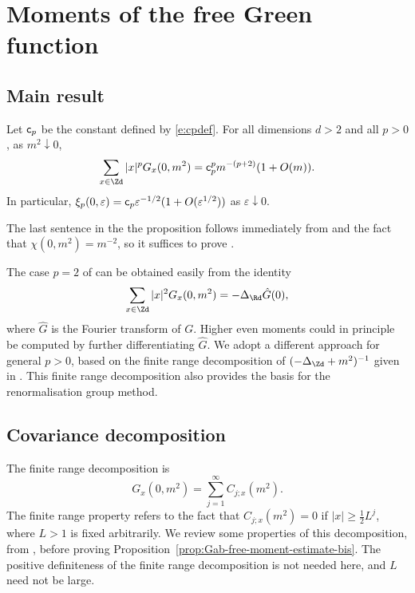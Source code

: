 \chapter{Moments of the free Green function}
\label{app:free-moments}

\section{Main result}

\begin{prop}\label{prop:Gab-free-moment-estimate-bis}
Let ${\sf c}_p$ be the constant defined by \eqref{e:cpdef}.
For all dimensions $d>2$ and all $p>0$,
as $m^2 \downarrow 0$,
\begin{equation}
\label{e:Gab-free-moment-estimate-bis}
\sum_{x\in\Zd} |x|^p G_{x}(0, m^2)
=
{\sf c}_p^p m^{-(p + 2)} (1 + O(m)).
\end{equation}
In particular, $\xi_p(0,\varepsilon) = {\sf c}_p \varepsilon^{-1/2}
(1+O(\varepsilon^{1/2}))$ as $\varepsilon \downarrow 0$.
\end{prop}

The last sentence in the the proposition follows immediately from
 and the fact that $\chi(0,m^2)=m^{-2}$,
so it suffices to prove .

The case $p = 2$ of 
can be obtained easily from the identity
\begin{equation}
\sum_{x\in\Zd} |x|^2 G_x(0, m^2) = -\Delta_\Rd \hat{G}(0),
\end{equation}
where $\hat G$ is the Fourier transform of $G$.
Higher even moments could in principle
be computed by further differentiating $\hat G$.
We adopt a different approach
for general $p>0$,
based on the finite range decomposition of $(-\Delta_{\Zd}+m^2)^{-1}$
given in \cite{BGM04,Baue13a}.
This finite range decomposition also provides the basis for the renormalisation group method.

\section{Covariance decomposition}

The finite range decomposition is
\begin{equation}
    G_x(0,m^2) = \sum_{j=1}^\infty C_{j;x}(m^2).
\end{equation}
The finite range property refers to the fact that $C_{j;x}(m^2) = 0$ if
$|x| \ge \frac 12 L^j$,
where $L>1$ is fixed arbitrarily.
 We review some properties of this decomposition, from
\cite{BBS-rg-pt,Baue13a}, before
proving Proposition~\ref{prop:Gab-free-moment-estimate-bis}.
The positive definiteness of the finite range
decomposition is not needed here, and $L$ need not be large.

